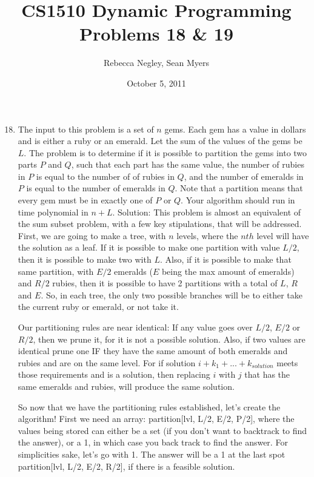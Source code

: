 \documentclass{article}
\title{CS1510  Dynamic Programming Problems 18 \& 19}
\author{Rebecca Negley, Sean Myers}
\date{October 5, 2011}
\begin{document}
\maketitle

\begin{enumerate}
\setcounter{enumi}{17}
\item The input to this problem is a set of $n$ gems. Each gem has a value in dollars and is either a ruby or an emerald. Let the sum of the values of the gems be $L$. The problem is to determine if it is possible to partition the gems into two parts $P$ and $Q$, such that each part has the same value, the number of rubies in $P$ is equal to the number of of rubies in $Q$, and the number of emeralds in $P$ is equal to the number of emeralds in $Q$. Note that a partition means that every gem must be in exactly one of $P$ or $Q$. Your algorithm should run in time polynomial in $n+L$.
\newline
\newline Solution: This problem is almost an equivalent of the sum subset problem, with a few key stipulations, that will be addressed. First, we are going to make a tree, with $n$ levels, where the $nth$ level will have the solution as a leaf. If it is possible to make one partition with value $L/2$, then it is possible to make two with $L$. Also, if it is possible to make that same partition, with $E/2$ emeralds ($E$ being the max amount of emeralds) and $R/2$ rubies, then it is possible to have 2 partitions with a total of $L$, $R$ and $E$. So, in each tree, the only two possible branches will be to either take the current ruby or emerald, or not take it. 

Our partitioning rules are near identical: If any value goes over $L/2$, $E/2$ or $R/2$, then we prune it, for it is not a possible solution. Also, if two values are identical prune one IF they have the same amount of both emeralds and rubies and are on the same level. For if solution $i + k_1 +...+ k_{solution}$ meets those requirements and is a solution, then replacing $i$ with $j$ that has the same emeralds and rubies, will produce the same solution.

So now that we have the partitioning rules established, let's create the algorithm! First we need an array: partition[lvl, L/2, E/2, P/2], where the values being stored can either be a set (if you don't want to backtrack to find the answer), or a 1, in which case you back track to find the answer. For simplicities sake, let's go with 1. The answer will be a 1 at the last spot partition[lvl, L/2, E/2, R/2], if there is a feasible solution. 


\end{enumerate}
\end{document}
